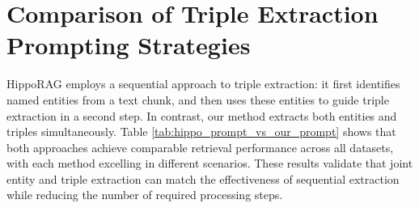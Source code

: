 \section{Comparison of Triple Extraction Prompting Strategies}
\label{appendix_sec:hipporag_results_original_prompt}

\begin{table*}[thbp]
\small
\centering
{}
\caption{Retrieval performance comparison between HippoRAG's sequential triple extraction method and our joint extraction approach across three datasets.}
\label{tab:hippo_prompt_vs_our_prompt}
\end{table*}

HippoRAG employs a sequential approach to triple extraction: it first identifies named entities from a text chunk, and then uses these entities to guide triple extraction in a second step. In contrast, our method extracts both entities and triples simultaneously. Table \ref{tab:hippo_prompt_vs_our_prompt} shows that both approaches achieve comparable retrieval performance across all datasets, with each method excelling in different scenarios. These results validate that joint entity and triple extraction can match the effectiveness of sequential extraction while reducing the number of required processing steps.
